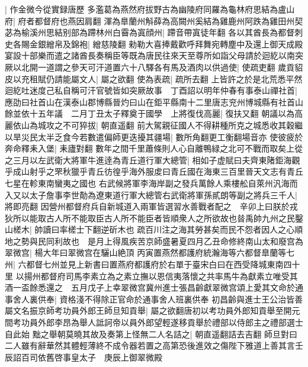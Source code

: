 |{
	作金微今從實録唐歷}
多濫葛為燕然府拔野古為幽陵府同羅為龜林府思結為盧山府|{
	府者都督府也燕因肩翻}
渾為臯蘭州斛薛為高闕州奚結為雞鹿州阿跌為雞田州契苾為榆溪州思結别部為蹛林州白霫為寘顔州|{
	蹛音帶寘徒年翻}
各以其酋長為都督刺史各賜金銀繒帛及錦袍|{
	繒慈陵翻}
勑勒大喜捧戴歡呼拜舞宛轉塵中及還上御天成殿宴設十部樂而遣之諸酋長奏稱臣等既為唐民往來天至尊所如詣父母請於迴紇以南突厥以北開一道謂之參天可汗道置六十八驛各有馬及酒肉以供過使|{
	使疏吏翻}
歲貢貂皮以充租賦仍請能屬文人|{
	屬之欲翻}
使為表疏|{
	疏所去翻}
上皆許之於是北荒悉平然迴紇吐迷度己私自稱可汗官號皆如突厥故事　丁酉詔以明年仲春有事泰山禪社首|{
	應劭曰社首山在漢泰山郡博縣晉灼曰山在鉅平縣南十二里唐志兖州博城縣有社首山}
餘並依十五年議　二月丁丑太子釋奠于國學　上將復伐高麗|{
	復扶又翻}
朝議以為高麗依山為城攻之不可猝拔|{
	朝直遥翻}
前大駕親征國人不得耕種所克之城悉收其穀繼以旱災民太半乏食今若數遣偏師更迭擾其疆場|{
	數所角翻更工衡翻場音亦}
使彼疲於奔命釋耒入堡|{
	耒廬對翻}
數年之間千里蕭條則人心自離鴨緑之北可不戰而取矣上從之三月以左武衛大將軍牛進逹為青丘道行軍大總管|{
	相如子虚賦曰夫齊東陼鉅海觀乎成山射乎之罘秋獵乎青丘彷徨乎海外服䖍曰青丘國在海東三百里晉天文志有青丘七星在軫東南蠻夷之國也}
右武候將軍李海岸副之發兵萬餘人乘樓舩自萊州汎海而入又以太子詹事李世勣為遼東道行軍大總管右武衛將軍孫貳朗等副之將兵三千人|{
	將即亮翻}
因營州都督府兵自新城道入兩軍皆選習水善戰者配之　辛卯上曰朕於戎狄所以能取古人所不能取臣古人所不能臣者皆順衆人之所欲故也㫺禹帥九州之民鑿山槎木|{
	帥讀曰率槎士下翻逆斫木也}
疏百川注之海其勞甚矣而民不怨者因人之心順地之勢與民同利故也　是月上得風疾苦京師盛暑夏四月乙丑命修終南山太和廢宫為翠微宫|{
	楊大年曰翠微宫在驪山絶頂}
丙寅置燕然都護府統瀚海等六都督臯蘭等七州|{
	六都督七州並見上新書曰置燕府都護府於右單于臺宋白曰在西受降城東南四十里}
以揚州都督府司馬李素立為之素立撫以恩信夷落懷之共率馬牛為獻素立唯受其酒一盃餘悉還之　五月戊子上幸翠微宫冀州進士張昌齡獻翠微宫頌上愛其文命於通事舍人裏供奉|{
	資格淺不得除正官命於通事舍人班裏供奉}
初昌齡與進士王公治皆善屬文名振京師考功員外郎王師旦知貢舉|{
	屬之欲翻唐初以考功員外郎知貢舉至開元間考功員外郎李昂為舉人詆訶帝以員外郎望輕遂移貢舉於禮部以侍郎主之禮部選士自此始}
黜之舉朝莫曉其故及奏第上怪無二人名詰之|{
	朝直遥翻詰去吉翻}
師旦對曰二人雖有辭華然其體輕薄終不成令器若置之高第恐後進效之傷陛下雅道上善其言壬辰詔百司依舊啓事皇太子　庚辰上御翠微殿

